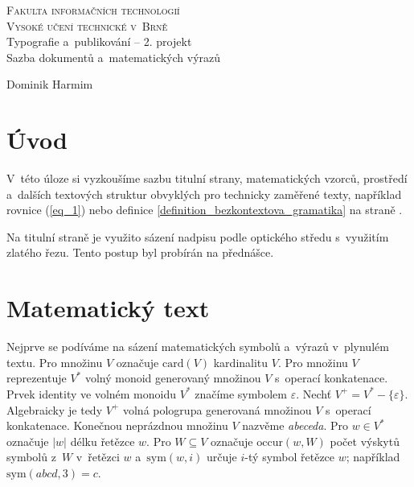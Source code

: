 \documentclass[a4paper, 11pt, twocolumn]{article}
\theoremstyle{definition}
\theoremstyle{plain}
\begin{document}
	\begin{titlepage}
		\begin{center}
			{\Huge\textsc{
				Fakulta informačních technologií \\
				Vysoké učení technické v~Brně
			}}
			{\LARGE
				\\ Typografie a~publikování -- 2. projekt \\
				Sazba dokumentů a~matematických výrazů
			}
		\end{center}

		{\Large
			\the\year
			\hfill
			Dominik Harmim
		}
	\end{titlepage}


	\section*{Úvod}

	V~této úloze si vyzkoušíme sazbu titulní strany, matematických vzorců, prostředí a~dalších
	textových struktur obvyklých pro technicky zaměřené texty, například rovnice (\ref{eq_1}) nebo definice
	\ref{definition_bezkontextova_gramatika} na straně \pageref{definition_bezkontextova_gramatika}.

	Na titulní straně je využito sázení nadpisu podle optického středu s~využitím zlatého řezu.
	Tento postup byl probírán na přednášce.


	\section{Matematický text}

	Nejprve se podíváme na sázení matematických symbolů a~výrazů v~plynulém textu. Pro množinu
	$ V $ označuje $ \text{card}(V) $ kardinalitu $ V $. Pro množinu $ V $ reprezentuje $ V^* $
	volný monoid generovaný množinou $ V $ s~operací konkatenace. Prvek identity ve volném monoidu
	$ V^* $ značíme symbolem $ \varepsilon $. Nechť $ V^+ = V^* - \{ \varepsilon \} $. Algebraicky
	je tedy $ V^+ $ volná pologrupa generovaná množinou $ V $ s~operací konkatenace. Konečnou
	neprázdnou množinu $ V $ nazvěme \emph{abeceda}. Pro $ w \in V^* $ označuje $ |w| $ délku řetězce
	$ w $. Pro $ W \subseteq V $ označuje $ \text{occur}(w, W) $ počet výskytů symbolů z~$ W $
	v~řetězci $ w $ a~$ \text{sym}(w, i) $ určuje $ i $-tý symbol řetězce $ w $; například
	$ \text{sym}(abcd, 3) = c $.
\end{document}
